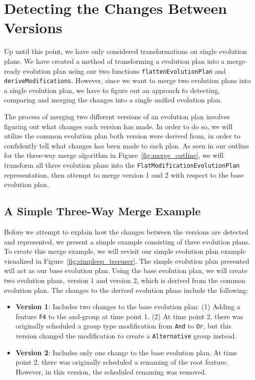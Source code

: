 \documentclass[a4paper,english]{ifimaster}
\begin{document}
\section{Detecting the Changes Between Versions}%
\label{sec:detecting_the_changes_between_versions}

Up until this point, we have only considered transformations on single evolution plans. We have created a method of transforming a evolution plan into a merge-ready evolution plan using our two functions \texttt{flattenEvolutionPlan} and \texttt{deriveModifications}. However, since we want to merge two evolution plans into a single evolution plan, we have to figure out an approach to detecting, comparing and merging the changes into a single unified evolution plan.

The process of merging two different versions of an evolution plan involves figuring out what changes each version has made. In order to do so, we will utilize the common evolution plan both version were derived from, in order to confidently tell what changes has been made to each plan. As seen in our outline for the three-way merge algorithm in Figure~\vref{fig:merge_outline}, we will transform all three evolution plans into the \texttt{FlatModificationEvolutionPlan} representation, then attempt to merge version 1 and 2 with respect to the base evolution plan.

\subsection{A Simple Three-Way Merge Example}%
\label{sub:a_simple_three_way_merge_example}

Before we attempt to explain how the changes between the versions are detected and represented, we present a simple example consisting of three evolution plans. To create this merge example, we will revisit our simple evolution plan example visualized in Figure~\ref{fig:simpleep_treeuser}. The simple evolution plan presented will act as our base evolution plan. Using the base evolution plan, we will create two evolution plans, version 1 and version 2, which is derived from the common evolution plan. The changes to the derived evolution plans include the following:

\begin{itemize}
  \item \textbf{Version 1}: Includes two changes to the base evolution plan: (1) Adding a feature \texttt{F4} to the and-group at time point 1. (2) At time point 2, there was originally scheduled a group type modification from \texttt{And} to \texttt{Or}, but this version changed the modification to create a \texttt{Alternative} group instead.
  \item \textbf{Version 2}: Includes only one change to the base evolution plan. At time point 2, there was originally scheduled a renaming of the root feature. However, in this version, the scheduled renaming was removed.
\end{itemize}
\end{document}
